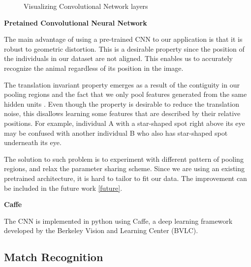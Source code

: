 \begin{figure}[h!]
  \captionsetup{justification=centering}
  \caption{Visualizing Convolutional Network layers}
\end{figure}


\textbf{Pretained Convolutional Neural Network}

The main advantage of using a pre-trained CNN to our application is that it is robust to geometric distortion. This is a desirable property since the position of the individuals in our dataset are not aligned. This enables us to accurately recognize the animal regardless of its position in the image. 

The translation invariant property emerges as a result of the contiguity in our pooling regions and the fact that we only pool features generated from the same hidden units \cite{ufldl}. Even though the property is desirable to reduce the translation noise, this disallows learning some features that are described by their relative positions. For example, individual A with a star-shaped spot right above its eye may be confused with another individual B who also has star-shaped spot underneath its eye. 

The solution to such problem is to experiment with different pattern of pooling regions, and relax the parameter sharing scheme. Since we are using an existing pretrained architecture, it is hard to tailor to fit our data. The improvement can be included in the future work \ref{future}.

\textbf{Caffe}

The CNN is implemented in python using Caffe\cite{caffe}, a deep learning framework developed by the Berkeley Vision and Learning Center (BVLC).

\subsection{Match Recognition}

